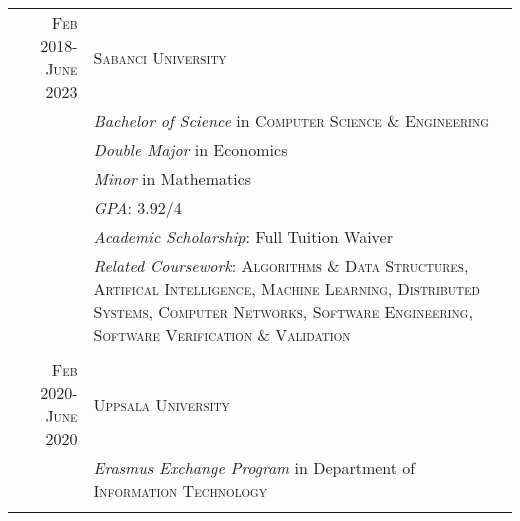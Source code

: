 \documentclass[a4paper,10pt]{article} %
\begin{document}
\begin{longtable}{r|p{11cm}}	


\textsc{Feb} 2018-\textsc{June} 2023& \textsc{Sabanci University}\\
& \small\emph{Bachelor of Science} in \textsc{Computer Science \& Engineering}\\%
& \small\emph{Double Major} in Economics\\
& \small\emph{Minor} in Mathematics\\
& \small\emph{GPA}: 3.92/4 \\
& \small\emph{Academic Scholarship}: Full Tuition Waiver\\
& \footnotesize{ \small\emph{Related Coursework}: \textsc{Algorithms \& Data Structures}, \textsc{Artifical Intelligence}, \textsc{Machine Learning}, \textsc{Distributed Systems}, \textsc{Computer Networks}, \textsc{Software Engineering}, \textsc{Software Verification \& Validation}}\\
\multicolumn{2}{c}{} \\

\textsc{Feb} 2020-\textsc{June} 2020& \textsc{Uppsala University}\\
& \small\emph{Erasmus Exchange Program} in Department of \textsc{Information Technology}\\%
&\\




\end{longtable}
\end{document}
